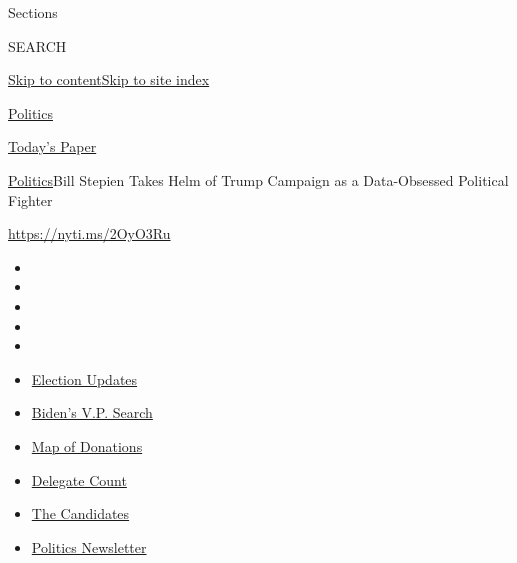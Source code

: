 Sections

SEARCH

\protect\hyperlink{site-content}{Skip to
content}\protect\hyperlink{site-index}{Skip to site index}

\href{https://www.nytimes3xbfgragh.onion/section/politics}{Politics}

\href{https://myaccount.nytimes3xbfgragh.onion/auth/login?response_type=cookie\&client_id=vi}{}

\href{https://www.nytimes3xbfgragh.onion/section/todayspaper}{Today's
Paper}

\href{/section/politics}{Politics}\textbar{}Bill Stepien Takes Helm of
Trump Campaign as a Data-Obsessed Political Fighter

\url{https://nyti.ms/2OyO3Ru}

\begin{itemize}
\item
\item
\item
\item
\item
\end{itemize}

\begin{itemize}
\item
  \href{https://www.nytimes3xbfgragh.onion/2020/08/03/us/elections/biden-vs-trump.html?action=click\&pgtype=Article\&state=default\&region=TOP_BANNER\&context=storylines_menu}{Election
  Updates}
\item
  \href{https://www.nytimes3xbfgragh.onion/article/biden-vice-president-2020.html?action=click\&pgtype=Article\&state=default\&region=TOP_BANNER\&context=storylines_menu}{Biden's
  V.P. Search}
\item
  \href{https://www.nytimes3xbfgragh.onion/interactive/2020/07/24/us/politics/trump-biden-campaign-donors.html?action=click\&pgtype=Article\&state=default\&region=TOP_BANNER\&context=storylines_menu}{Map
  of Donations}
\item
  \href{https://www.nytimes3xbfgragh.onion/interactive/2020/us/elections/delegate-count-primary-results.html?action=click\&pgtype=Article\&state=default\&region=TOP_BANNER\&context=storylines_menu}{Delegate
  Count}
\item
  \href{https://www.nytimes3xbfgragh.onion/interactive/2019/us/politics/2020-presidential-candidates.html?action=click\&pgtype=Article\&state=default\&region=TOP_BANNER\&context=storylines_menu}{The
  Candidates}
\item
  \href{https://www.nytimes3xbfgragh.onion/newsletters/politics?action=click\&pgtype=Article\&state=default\&region=TOP_BANNER\&context=storylines_menu}{Politics
  Newsletter}
\end{itemize}

